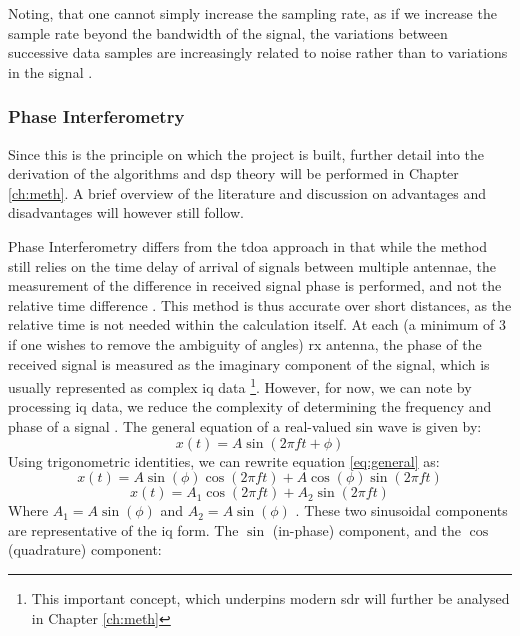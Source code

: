 \documentclass[class=report,11pt,crop=false]{standalone}
\begin{document}
Noting, that one cannot simply increase the sampling rate, as if we increase the sample rate beyond the bandwidth of the signal, the variations between successive data samples are increasingly related to noise rather than to variations in the signal \cite{crfs_2021}.

\subsubsection{Phase Interferometry}

Since this is the principle on which the project is built, further detail into the derivation of the algorithms and \gls{dsp} theory will be performed in Chapter \ref{ch:meth}. A brief overview of the literature and discussion on advantages and disadvantages will however still follow.

Phase Interferometry differs from the \gls{tdoa} approach in that while the method still relies on the time delay of arrival of signals between multiple antennae, the measurement of the difference in received signal phase is performed, and not the relative time difference \cite{Phase-comparison}. This method is thus accurate over short distances, as the relative time is not needed within the calculation itself. At each (a minimum of 3 if one wishes to remove the ambiguity of angles) \gls{rx} antenna, the phase of the received signal is measured as the imaginary component of the signal, which is usually represented as complex \gls{iq} data \footnote{This important concept, which underpins modern \gls{sdr} will further be analysed in Chapter \ref{ch:meth}}. However, for now, we can note by processing \gls{iq} data, we reduce the complexity of determining the frequency and phase of a signal \cite{smith}. The general equation of a real-valued sin wave is given by:
\begin{equation}
    x(t) = A \sin(2 \pi f t + \phi)
    \label{eq:general}
\end{equation}
Using trigonometric identities, we can rewrite equation \ref{eq:general} as:
\begin{equation}
    x(t) = A\sin(\phi)\cos(2\pi f t) + A\cos(\phi)\sin(2\pi f t)
\end{equation}
\begin{equation}
    x(t) = A_1\cos(2\pi f t) + A_2\sin(2\pi f t)
    \label{eq:IQ-general}
\end{equation}
Where $A_1 = A\sin(\phi)$ and $A_2 = A\sin(\phi)$ \cite{phase-diff-calc}. These two sinusoidal components are representative of the \gls{iq} form. The $\sin$ (in-phase) component, and the $\cos$ (quadrature) component:
\end{document}
